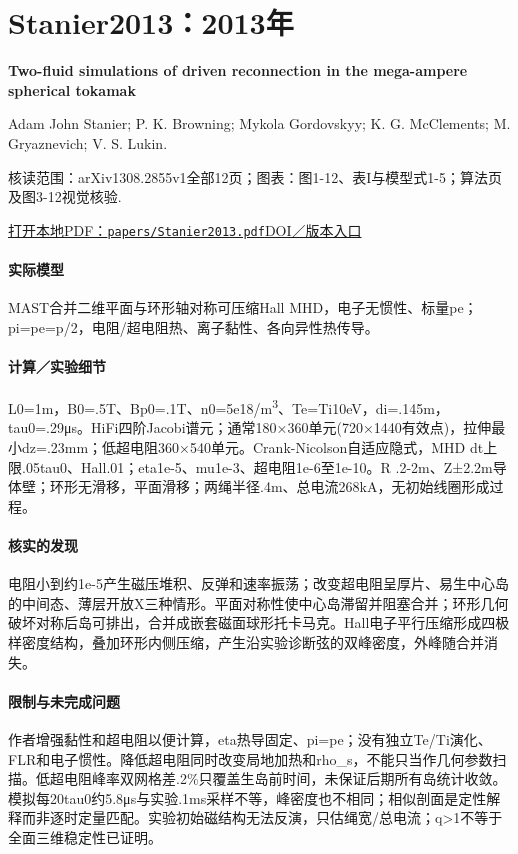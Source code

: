 \section{Stanier2013：2013年}\label{paper:Stanier2013}

\textbf{Two-fluid simulations of driven reconnection in the mega-ampere spherical tokamak}\citep{Stanier2013}\

Adam  John Stanier;  P. K. Browning;  Mykola Gordovskyy;  K. G. McClements;  M. Gryaznevich;  V. S. Lukin.

\textsf{核读范围：}arXiv1308.2855v1全部12页；\textsf{图表：}图1-12、表I与模型式1-5；算法页及图3-12视觉核验.

\href{run:papers/Stanier2013.pdf}{打开本地PDF：\texttt{papers/Stanier2013.pdf}}\quad\href{https://doi.org/10.1063/1.4830104}{DOI／版本入口}

\paragraph{实际模型}MAST合并二维平面与环形轴对称可压缩Hall MHD，电子无惯性、标量pe；pi=pe=p/2，电阻/超电阻热、离子黏性、各向异性热传导。

\paragraph{计算／实验细节}L0=1m，B0=.5T、Bp0=.1T、n0=5e18/m\textsuperscript{3}、Te=Ti10eV，di=.145m，tau0=.29μs。HiFi四阶Jacobi谱元；通常180×360单元(720×1440有效点)，拉伸最小dz=.23mm；低超电阻360×540单元。Crank-Nicolson自适应隐式，MHD dt上限.05tau0、Hall.01；eta1e-5、mu1e-3、超电阻1e-6至1e-10。R .2-2m、Z±2.2m导体壁；环形无滑移，平面滑移；两绳半径.4m、总电流268kA，无初始线圈形成过程。

\paragraph{核实的发现}电阻小到约1e-5产生磁压堆积、反弹和速率振荡；改变超电阻呈厚片、易生中心岛的中间态、薄层开放X三种情形。平面对称性使中心岛滞留并阻塞合并；环形几何破坏对称后岛可排出，合并成嵌套磁面球形托卡马克。Hall电子平行压缩形成四极样密度结构，叠加环形内侧压缩，产生沿实验诊断弦的双峰密度，外峰随合并消失。

\paragraph{限制与未完成问题}作者增强黏性和超电阻以便计算，eta热导固定、pi=pe；没有独立Te/Ti演化、FLR和电子惯性。降低超电阻同时改变局地加热和rho\_s，不能只当作几何参数扫描。低超电阻峰率双网格差.2\%只覆盖生岛前时间，未保证后期所有岛统计收敛。模拟每20tau0约5.8μs与实验.1ms采样不等，峰密度也不相同；相似剖面是定性解释而非逐时定量匹配。实验初始磁结构无法反演，只估绳宽/总电流；q>1不等于全面三维稳定性已证明。

